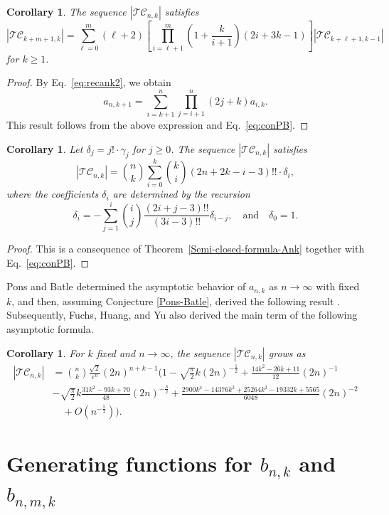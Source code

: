 \documentclass[reqno, 12pt]{article}
\newtheorem{cor}[thm]{Corollary}
\theoremstyle{mydefinition}
\theoremstyle{myremark}
\numberwithin{algorithm}{section}
\begin{document}
\begin{cor}\label{PonsBatlePropo10}
The sequence  $|\mathcal{TC}_{n,k}|$ satisfies
$$|\mathcal{TC}_{k+m+1,k}|=\sum_{\ell=0}^m (\ell+2)\left[\prod_{i=\ell+1}^m \left( 1+ \frac{k}{i+1}\right)(2i+3k-1) \right] |\mathcal{TC}_{k+\ell+1,k-1}|$$
for $k\geq 1$.
\end{cor}
\begin{proof}
By Eq.~\eqref{eq:recank2}, we obtain
$$a_{n,k+1}=\sum_{i=k+1}^n \prod_{j=i+1}^n (2j+k)a_{i,k}.$$
This result follows from the above expression and Eq.~\eqref{eq:conPB}.
\end{proof}


\begin{cor}\label{PonsBatlePropo11}
Let $\delta_j=j!\cdot \gamma_j$ for $j\geq 0$.
The sequence $|\mathcal{TC}_{n,k}|$ satisfies
$$|\mathcal{TC}_{n,k}|=\binom{n}{k}\sum_{i=0}^k \binom{k}{i} (2n+2k-i-3)!!\cdot \delta_i,$$
where the coefficients $\delta_i$ are determined by the recursion
$$\delta_i=-\sum_{j=1}^i \binom{i}{j} \frac{(2i+j-3)!!}{(3i-3)!!} \delta_{i-j},\quad \text{and}\quad \delta_0=1.$$
\end{cor}
\begin{proof}
This is a consequence of Theorem~\ref{Semi-closed-formula-Ank} together with Eq.~\eqref{eq:conPB}.
\end{proof}


Pons and Batle \cite[Proposition 7]{PB} determined the asymptotic behavior of $a_{n,k}$ as $n\rightarrow \infty$ with fixed $k$, and then, assuming Conjecture \ref{Pons-Batle}, derived the following result \cite[Proposition 12]{PB}.
Subsequently, Fuchs, Huang, and Yu \cite{FHY22} also derived the main term of the following asymptotic formula.

\begin{cor}\label{PonsBatlePropo12}
For $k$ fixed and $n\rightarrow \infty$, the sequence $|\mathcal{TC}_{n,k}|$ grows as
\begin{align*}
|\mathcal{TC}_{n,k}|&=\binom{n}{k}\frac{\sqrt{2}}{e^n}(2n)^{n+k-1}\bigg(1-\sqrt{\frac{\pi}{2}} k (2n)^{-\frac{1}{2}} +\frac{14k^2-26k+11}{12} (2n)^{-1}
\\&- \sqrt{\frac{\pi}{2}} k \frac{31k^2-93k+70}{48}(2n)^{-\frac{3}{2}} + \frac{2900k^4-14376k^3+25264k^2-19332 k +5565}{6048} (2n)^{-2}
\\& \quad +O(n^{-\frac{5}{2}})\bigg).
\end{align*}
\end{cor}



\section{Generating functions for $b_{n,k}$ and $b_{n,m,k}$}\label{Section-Generating-function}
\end{document}
